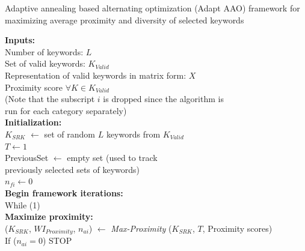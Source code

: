 \begin{algorithm}
\fontsize{8pt}{1em}\selectfont
\caption{Adaptive annealing based alternating optimization (Adapt AAO) framework for maximizing average proximity and diversity of selected keywords }
\label{algo:AdaptAAO}
\textbf{Inputs:} \\ 
\hspace*{2mm}           Number of keywords: $L$ \\
\hspace*{2mm}           Set of valid keywords: $K_{Valid}$ \\
\hspace*{2mm}          Representation of valid keywords in matrix form: $X$\\
\hspace*{2mm}           Proximity score $\forall K \in K_{Valid}$  \\ 
\hspace*{2mm}   (Note that the subscript $i$ is dropped since the algorithm is \\ 
\hspace*{2mm}   run for each category separately) \\ 
\textbf{Initialization:} \\ 
\hspace*{2mm}        $K_{SRK}$ $\leftarrow$ set of random $L$ keywords from $K_{Valid}$ \\ 
\hspace*{2mm}           $T \leftarrow 1$ \\ 
\hspace*{2mm}        PreviousSet $\leftarrow$ empty set (used to track \\
\hspace*{2mm}        previously  selected sets of keywords) \\ 
\hspace*{2mm}           $n_{fi} \leftarrow 0$  \\ 
\textbf{Begin framework iterations: } \\ 
\hspace*{2mm}        While (1) 		 \\ 
\hspace*{6mm}        \textbf{Maximize proximity:} \\ 
\hspace*{6mm}        ($K_{SRK}$,  $WI_{Proximity}$, $n_{ai}$) $\leftarrow$ \textit{Max-Proximity} ($K_{SRK}$, $T$, Proximity scores)  \\ 
\hspace*{6mm}        If ($n_{ai} = 0$)  STOP   \\

\end{algorithm}
